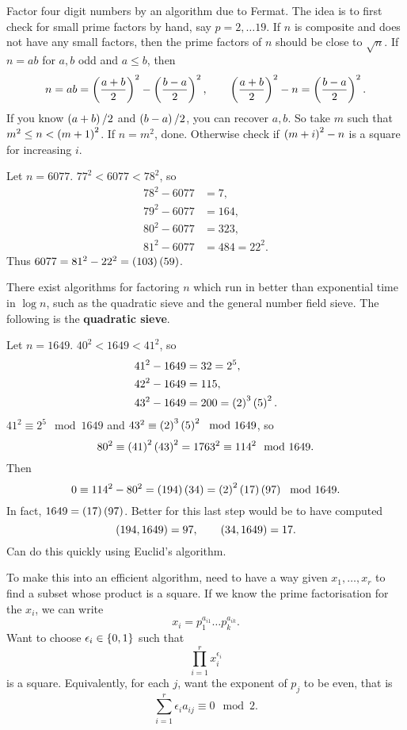 Factor four digit numbers by an algorithm due to Fermat. The idea is to first check for small prime factors by hand, say $ p = 2, \dots 19 $. If $ n $ is composite and does not have any small factors, then the prime factors of $ n $ should be close to $ \sqrt{n} $. If $ n = ab $ for $ a, b $ odd and $ a \le b $, then
$$ n = ab = \br{\dfrac{a + b}{2}}^2 - \br{\dfrac{b - a}{2}}^2, \qquad \br{\dfrac{a + b}{2}}^2 - n = \br{\dfrac{b - a}{2}}^2. $$
If you know $ \br{a + b} / 2 $ and $ \br{b - a} / 2 $, you can recover $ a, b $. So take $ m $ such that $ m^2 \le n < \br{m + 1}^2 $. If $ n = m^2 $, done. Otherwise check if $ \br{m + i}^2 - n $ is a square for increasing $ i $.

\begin{example*}
Let $ n = 6077 $. $ 77^2 < 6077 < 78^2 $, so
\begin{align*}
78^2 - 6077 & = 7, \\
79^2 - 6077 & = 164, \\
80^2 - 6077 & = 323, \\
81^2 - 6077 & = 484 = 22^2.
\end{align*}
Thus $ 6077 = 81^2 - 22^2 = \br{103}\br{59} $.
\end{example*}

\pagebreak

There exist algorithms for factoring $ n $ which run in better than exponential time in $ \log n $, such as the quadratic sieve and the general number field sieve. The following is the \textbf{quadratic sieve}.

\begin{example*}
Let $ n = 1649 $. $ 40^2 < 1649 < 41^2 $, so
\begin{align*}
41^2 - 1649 & = 32 = 2^5, \\
42^2 - 1649 & = 115, \\
43^2 - 1649 & = 200 = \br{2}^3\br{5}^2.
\end{align*}
$ 41^2 \equiv 2^5 \mod 1649 $ and $ 43^2 \equiv \br{2}^3\br{5}^2 \mod 1649 $, so
$$ 80^2 \equiv \br{41}^2\br{43}^2 = 1763^2 \equiv 114^2 \mod 1649. $$
Then
$$ 0 \equiv 114^2 - 80^2 = \br{194}\br{34} = \br{2}^2\br{17}\br{97} \mod 1649. $$
In fact, $ 1649 = \br{17}\br{97} $. Better for this last step would be to have computed
$$ \br{194, 1649} = 97, \qquad \br{34, 1649} = 17. $$
Can do this quickly using Euclid's algorithm.
\end{example*}

To make this into an efficient algorithm, need to have a way given $ x_1, \dots, x_r $ to find a subset whose product is a square. If we know the prime factorisation for the $ x_i $, we can write
$$ x_i = p_1^{a_{i1}} \dots p_k^{a_{ik}}. $$
Want to choose $ \epsilon_i \in \cbr{0, 1} $ such that
$$ \prod_{i = 1}^r x_i^{\epsilon_i} $$
is a square. Equivalently, for each $ j $, want the exponent of $ p_j $ to be even, that is
$$ \sum_{i = 1}^r \epsilon_ia_{ij} \equiv 0 \mod 2. $$

